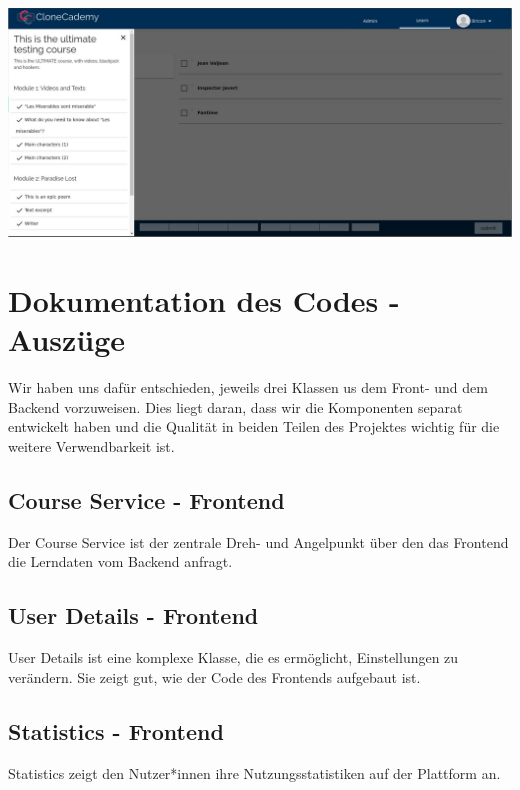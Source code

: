 \documentclass[accentcolor=tud0b,12pt,paper=a4]{tudreport}
\begin{document}
\includegraphics[height=0.3\textheight]{appendix/screenshots/question-0.jpeg}



\chapter*{Dokumentation des Codes - Auszüge}

Wir haben uns dafür entschieden, jeweils drei Klassen us dem Front- und dem Backend vorzuweisen. Dies liegt daran, dass wir die Komponenten separat entwickelt haben und die Qualität in beiden Teilen des Projektes wichtig für die weitere Verwendbarkeit ist.

\section*{Course Service - Frontend}
Der Course Service ist der zentrale Dreh- und Angelpunkt über den das Frontend die Lerndaten vom Backend anfragt.



\section*{User Details - Frontend}
User Details ist eine komplexe Klasse, die es ermöglicht, Einstellungen zu verändern. Sie zeigt gut, wie der Code des Frontends aufgebaut ist.



\section*{Statistics - Frontend}
Statistics zeigt den Nutzer*innen ihre Nutzungsstatistiken auf der Plattform an. 


\end{document}
